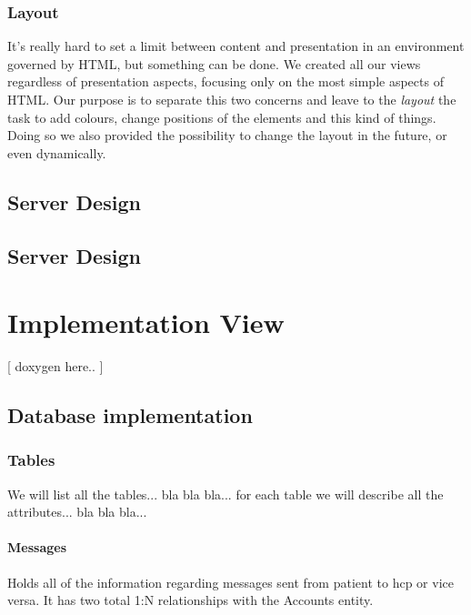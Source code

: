 \documentclass[12pt]{report}
\begin{document}
\subsection{Layout}
It's really hard to set a limit between content and presentation in an environment governed by HTML, but something can be done. We created all our views regardless of presentation aspects, focusing only on the most simple aspects of HTML. Our purpose is to separate this two concerns and leave to the \emph{layout} the task to add colours, change positions of the elements and this kind of things. Doing so we also provided the possibility to change the layout in the future, or even dynamically.

\section{Server Design}


\section{Server Design}

\chapter{Implementation View}
[ doxygen here.. ]

\section{Database implementation}
\subsection{Tables}
We will list all the tables... bla bla bla... for each table we will describe all the attributes... bla bla bla...

\subsubsection{Messages}
Holds all of the information regarding messages sent from patient to hcp or vice versa. It has two total 1:N relationships with the Accounts entity.
\end{document}
